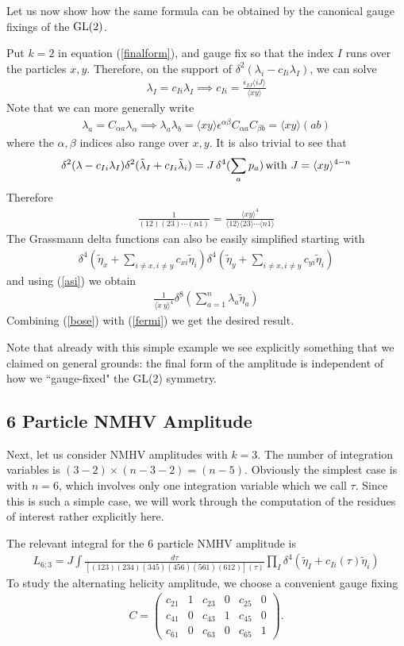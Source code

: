 \documentclass[12pt]{article}
\newcommand{\be}{\begin{eqnarray}}
\newcommand{\ee}{\end{eqnarray}}
\begin{document}
Let us now show how the same formula can be obtained by the canonical gauge fixings of the ${\rm GL}(2)$.

Put $k=2$ in equation (\ref{finalform}), and gauge fix so that the index $I$ runs over the particles
$x,y$. Therefore, on the support of
$\delta^2(\lambda_i - c_{Ii} \lambda_I)$, we can solve
\be
\label{asi}
\lambda_I = c_{Ii} \lambda_I \implies c_{Ii} = \frac{\epsilon_{IJ} \langle i J \rangle}{\langle x y \rangle}
\ee
Note that we can more generally write
\be
\lambda_a = C_{\alpha a} \lambda_\alpha \implies \lambda_a \lambda_b = \langle x y \rangle \epsilon^{\alpha \beta} C_{\alpha a} C_{\beta b}
= \langle x y \rangle (a b)
\ee
where the $\alpha, \beta$ indices also range over $x,y$. It is also trivial to see that
\be
\delta^2(\lambda- c_{Ii} \lambda_I) \delta^2(\tilde \lambda_I + c_{Ii} \tilde \lambda_i) = J \, \delta^4(\sum_a p_a) \, {\rm with} \, \,
J = \langle x y \rangle^{4 - n}
\ee
Therefore
\be
\label{bose}
\frac{1}{(12)(23) \cdots (n1)} = \frac{\langle x y \rangle^4}{\langle 1 2 \rangle \langle 2 3 \rangle \cdots \langle n 1 \rangle}
\ee
The Grassmann delta functions can also be easily simplified starting with
%
\be
\delta^4(\tilde\eta_x+\sum_{i\neq x,i\neq y}c_{xi}\tilde\eta_i)\delta^4(\tilde\eta_y+\sum_{i\neq x,i\neq y}c_{yi}\tilde\eta_i)
\ee
%
and using (\ref{asi}) we obtain
%
\be
\label{fermi}
\frac{1}{\langle x~y\rangle^4}\delta^8(\sum_{a=1}^n \lambda_a\tilde\eta_a)
\ee
Combining (\ref{bose}) with (\ref{fermi}) we get the desired result.

Note that already with this simple example we see explicitly something that we claimed on general grounds: the final form of the amplitude is independent of how we ``gauge-fixed" the GL(2) symmetry. 

\subsection{6 Particle NMHV Amplitude}

Next, let us consider NMHV amplitudes with $k=3$. The number of integration variables is $(3 - 2) \times (n - 3 - 2) = (n-5)$. Obviously the simplest case is with $n=6$, which involves only one integration variable which we call $\tau$.
Since this is such a simple case, we will work through the computation of the residues of interest rather explicitly here. 

The relevant integral for the 6 particle NMHV amplitude is
\be
 L_{6;3} = J \int
 \frac{d\tau}{\left[(123)(234)(345)(456)(561)(612)\right](\tau)}
 \prod_I \delta^4(\tilde \eta_I + c_{Ii}(\tau) \tilde \eta_i)
\ee
To study the alternating helicity amplitude, we choose a convenient gauge fixing
\be \label{alter} C =
\left(\begin{array}{cccccc} c_{21} & 1 & c_{23} & 0 & c_{25} & 0 \\
c_{41} & 0 & c_{43} & 1 & c_{45} & 0 \\ c_{61} & 0 & c_{63} & 0 &
c_{65} & 1
\end{array}\right).
\ee
\end{document}
